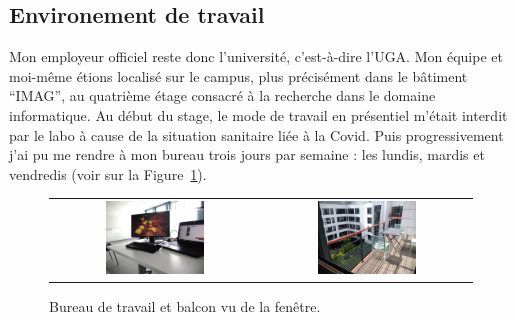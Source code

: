 \subsection{Environement de travail}

Mon employeur officiel reste donc l'université, c'est-à-dire l'UGA. Mon équipe 
et moi-même étions localisé sur le campus, plus précisément dans le bâtiment 
``IMAG'', au quatrième étage consacré à la recherche dans le domaine 
informatique. Au début du stage, le mode de travail en présentiel m'était 
interdit par le labo à cause de la situation sanitaire liée à la Covid. Puis 
progressivement j'ai pu me rendre à mon bureau trois jours par semaine : les 
lundis, mardis et vendredis (voir sur la Figure~\ref{fig:imag}).

\begin{figure}[h!t] \centering
    \begin{tabular}{@{}c@{\hspace{5pt}}c@{}}
    \includegraphics[width=0.49\textwidth]{images/desk} & \includegraphics[width=0.49\textwidth]{images/balcony}
    \end{tabular}
    \caption{Bureau de travail et balcon vu de la fenêtre.}
    \label{fig:imag}
\end{figure}
